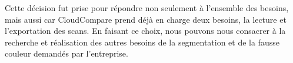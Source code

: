 \documentclass[12pt,titlepage,french]{article}
\begin{document}
Cette décision fut prise pour répondre non seulement à l'ensemble des besoins, mais aussi car CloudCompare prend déjà en charge deux besoins, la lecture et l'exportation des scans. En faisant ce choix, nous pouvons nous consacrer à la recherche et réalisation des autres besoins de la segmentation et de la fausse couleur demandés par l'entreprise.







\newpage
\end{document}
